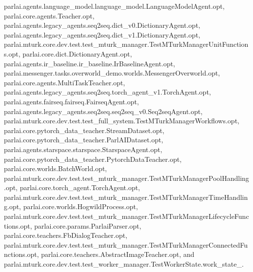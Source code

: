 parlai.\+agents.\+language\+\_\+model.\+language\+\_\+model.\+Language\+Model\+Agent.\+opt, parlai.\+core.\+agents.\+Teacher.\+opt, parlai.\+agents.\+legacy\+\_\+agents.\+seq2seq.\+dict\+\_\+v0.\+Dictionary\+Agent.\+opt, parlai.\+agents.\+legacy\+\_\+agents.\+seq2seq.\+dict\+\_\+v1.\+Dictionary\+Agent.\+opt, parlai.\+mturk.\+core.\+dev.\+test.\+test\+\_\+mturk\+\_\+manager.\+Test\+M\+Turk\+Manager\+Unit\+Functions.\+opt, parlai.\+core.\+dict.\+Dictionary\+Agent.\+opt, parlai.\+agents.\+ir\+\_\+baseline.\+ir\+\_\+baseline.\+Ir\+Baseline\+Agent.\+opt, parlai.\+messenger.\+tasks.\+overworld\+\_\+demo.\+worlds.\+Messenger\+Overworld.\+opt, parlai.\+core.\+agents.\+Multi\+Task\+Teacher.\+opt, parlai.\+agents.\+legacy\+\_\+agents.\+seq2seq.\+torch\+\_\+agent\+\_\+v1.\+Torch\+Agent.\+opt, parlai.\+agents.\+fairseq.\+fairseq.\+Fairseq\+Agent.\+opt, parlai.\+agents.\+legacy\+\_\+agents.\+seq2seq.\+seq2seq\+\_\+v0.\+Seq2seq\+Agent.\+opt, parlai.\+mturk.\+core.\+dev.\+test.\+test\+\_\+full\+\_\+system.\+Test\+M\+Turk\+Manager\+Workflows.\+opt, parlai.\+core.\+pytorch\+\_\+data\+\_\+teacher.\+Stream\+Dataset.\+opt, parlai.\+core.\+pytorch\+\_\+data\+\_\+teacher.\+Parl\+A\+I\+Dataset.\+opt, parlai.\+agents.\+starspace.\+starspace.\+Starspace\+Agent.\+opt, parlai.\+core.\+pytorch\+\_\+data\+\_\+teacher.\+Pytorch\+Data\+Teacher.\+opt, parlai.\+core.\+worlds.\+Batch\+World.\+opt, parlai.\+mturk.\+core.\+dev.\+test.\+test\+\_\+mturk\+\_\+manager.\+Test\+M\+Turk\+Manager\+Pool\+Handling.\+opt, parlai.\+core.\+torch\+\_\+agent.\+Torch\+Agent.\+opt, parlai.\+mturk.\+core.\+dev.\+test.\+test\+\_\+mturk\+\_\+manager.\+Test\+M\+Turk\+Manager\+Time\+Handling.\+opt, parlai.\+core.\+worlds.\+Hogwild\+Process.\+opt, parlai.\+mturk.\+core.\+dev.\+test.\+test\+\_\+mturk\+\_\+manager.\+Test\+M\+Turk\+Manager\+Lifecycle\+Functions.\+opt, parlai.\+core.\+params.\+Parlai\+Parser.\+opt, parlai.\+core.\+teachers.\+Fb\+Dialog\+Teacher.\+opt, parlai.\+mturk.\+core.\+dev.\+test.\+test\+\_\+mturk\+\_\+manager.\+Test\+M\+Turk\+Manager\+Connected\+Functions.\+opt, parlai.\+core.\+teachers.\+Abstract\+Image\+Teacher.\+opt, and parlai.\+mturk.\+core.\+dev.\+test.\+test\+\_\+worker\+\_\+manager.\+Test\+Worker\+State.\+work\+\_\+state\+\_.

\mbox{\label{classparlai_1_1mturk_1_1core_1_1dev_1_1test_1_1test__worker__manager_1_1TestWorkerState_aa8a9f7fe801eb68ee6728fe3f0fc134d}} 
